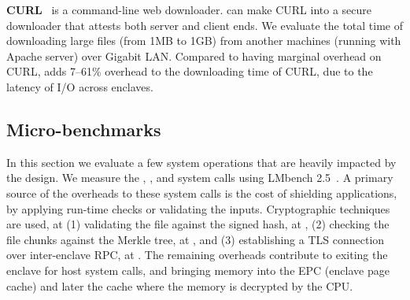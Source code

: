 {\bf CURL}~\cite{curl} is a command-line  web downloader.
\graphenesgx{} can make CURL into a secure downloader that attests both server and client ends.
We evaluate the total time of downloading large files (from 1MB to 1GB) from another machines (running with Apache server) over Gigabit LAN.
Compared to  \graphene{} having marginal overhead on CURL,
\graphenesgx{} adds 7--61\% overhead to the downloading time of CURL, due to the latency of I/O across enclaves.


\subsection{Micro-benchmarks}


In this section we evaluate a few system operations that are heavily impacted by the \graphenesgx{} design.
We measure the , , and  system calls
using LMbench 2.5~\cite{McVoy:lmbench}.
A primary source of the overheads to these system calls is the cost of shielding applications, by applying run-time checks or validating the inputs.
Cryptographic techniques are used, at (1) validating the file against the signed hash, at , (2) checking the file chunks against the Merkle tree, at , and (3) establishing a TLS connection over inter-enclave RPC, at .
The remaining overheads contribute to exiting the enclave for host system calls, and bringing memory into the EPC (enclave page cache) and later the cache where the memory is decrypted by the CPU.


